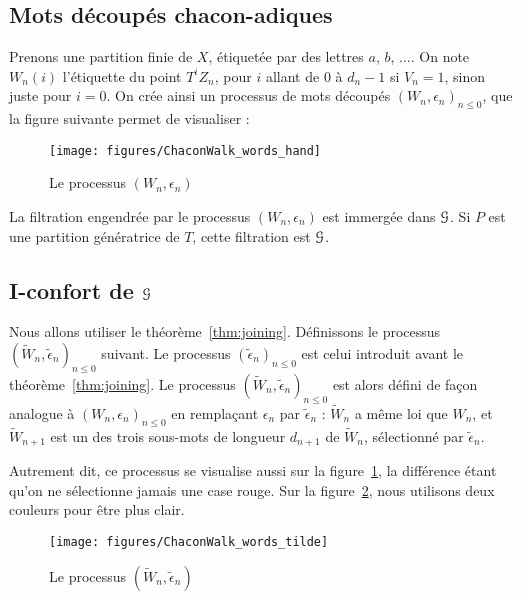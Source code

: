 \documentclass[12pt,a4paper]{article}
\begin{document}
\subsection{Mots découpés chacon-adiques}

Prenons une partition finie de $X$, étiquetée par des lettres $a$, $b$, $\ldots$.  
On note $W_n(i)$ l'étiquette du point $T^iZ_n$, pour $i$ allant de 
$0$ à $d_n-1$ si $V_n=1$, sinon juste pour $i=0$. 
On crée ainsi un processus de mots découpés ${(W_n, \epsilon_n)}_{n \leq 0}$, 
que la figure suivante permet de visualiser :

\begin{figure}[!h]
\centering
	\texttt{[image: figures/ChaconWalk\_words\_hand]}
\caption{Le processus $(W_n, \epsilon_n)$}\label{fig:Wn}
\end{figure}

La filtration engendrée par le processus $(W_n, \epsilon_n)$ est immergée dans 
$\EuScript{G}$. 
Si $P$ est une partition génératrice de $T$, cette filtration est 
 $\EuScript{G}$.  


\subsection{I-confort de $\EuScript{G}$}


Nous allons utiliser le théorème~\ref{thm:joining}. 
Définissons le processus  ${(\widetilde{W}_n, \widetilde{\epsilon}_n)}_{n \leq 0}$ suivant. 
Le processus ${(\widetilde{\epsilon}_n)}_{n \leq 0}$ est celui introduit 
avant le théorème~\ref{thm:joining}. 
Le processus  ${(\widetilde{W}_n, \widetilde{\epsilon}_n)}_{n \leq 0}$ 
est alors défini de façon analogue à ${(W_n, \epsilon_n)}_{n \leq 0}$ 
en remplaçant $\epsilon_n$ par $\widetilde{\epsilon}_n$ : 
$\widetilde{W}_n$ a même loi que $W_n$, et $\widetilde{W}_{n+1}$ est un 
des trois sous-mots de longueur $d_{n+1}$ de $\widetilde{W}_n$, sélectionné par 
$\widetilde{\epsilon}_n$. 

Autrement dit, ce processus se visualise aussi sur la figure~\ref{fig:Wn}, 
la différence étant qu'on ne sélectionne jamais une case rouge. 
Sur la figure~\ref{fig:tildeWn}, nous utilisons deux couleurs pour être plus clair.


\begin{figure}[!h]
\centering
	\texttt{[image: figures/ChaconWalk\_words\_tilde]}
\caption{Le processus $(\widetilde{W}_n, \widetilde{\epsilon}_n)$}\label{fig:tildeWn}
\end{figure}
\end{document}
